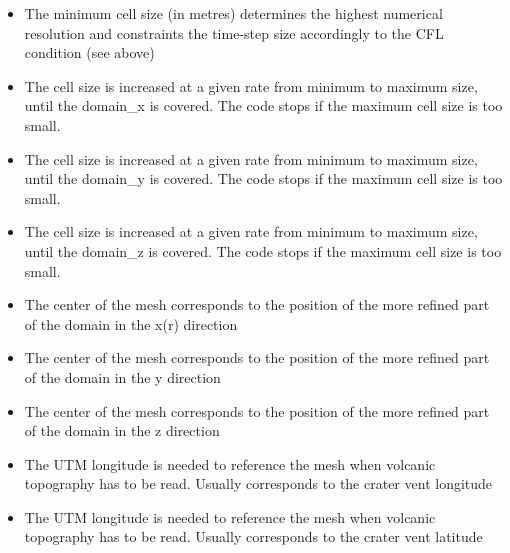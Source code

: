 \begin{itemize}
\item
{}
{The minimum cell size (in metres) determines the highest numerical resolution and constraints the time-step size accordingly to the CFL condition (see above)}

\item
{}
{The cell size is increased at a given rate from minimum to maximum size, until the domain\_x is covered. The code stops if the maximum cell size is too small.}

\item
{}
{The cell size is increased at a given rate from minimum to maximum size, until the domain\_y is covered. The code stops if the maximum cell size is too small.}

\item
{}
{The cell size is increased at a given rate from minimum to maximum size, until the domain\_z is covered. The code stops if the maximum cell size is too small.}

\item
{}
{The center of the mesh corresponds to the position of the more refined part of the domain in the x(r) direction}

\item
{}
{The center of the mesh corresponds to the position of the more refined part of the domain in the y direction}

\item
{}
{The center of the mesh corresponds to the position of the more refined part of the domain in the z direction}

\item
{}
{The UTM longitude is needed to reference the mesh when volcanic topography has to be read. Usually corresponds to the crater vent longitude}

\item
{}
{The UTM longitude is needed to reference the mesh when volcanic topography has to be read. Usually corresponds to the crater vent latitude}


\end{itemize}
